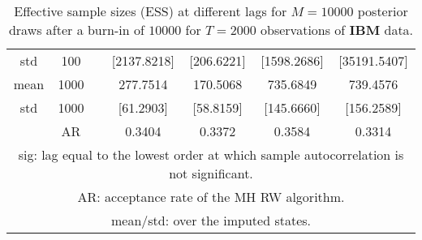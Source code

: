 {\begin{table}
\begin{tabular}{ccc cc cc}
std & 100 &  & [2137.8218]  & [206.6221]  & [1598.2686]  & [35191.5407]  \\  [1ex]
mean & 1000 &  & 277.7514  & 170.5068  & 735.6849  & 739.4576  \\ 
std & 1000 &  & [61.2903]  & [58.8159]  & [145.6660]  & [156.2589]  \\  [1ex]
 & AR &  & 0.3404  & 0.3372  & 0.3584  & 0.3314  \\  [1ex]
\hline 
\multicolumn{7}{p{11cm}}{\footnotesize{sig: lag equal to the lowest order at which sample autocorrelation is not significant.}}  \\ 
\multicolumn{7}{p{11cm}}{\footnotesize{AR: acceptance rate of the MH RW algorithm.}}  \\ 
\multicolumn{7}{p{11cm}}{\footnotesize{mean/std: over the imputed states.}}  \\ 
\end{tabular}
 \caption{Effective sample sizes (ESS) at different lags  for $M=10000$ posterior draws after a burn-in of $10000$ for $T=2000$ observations of \textbf{IBM} data.}
\label{tab:ESS_IBM}  
\end{table}
}